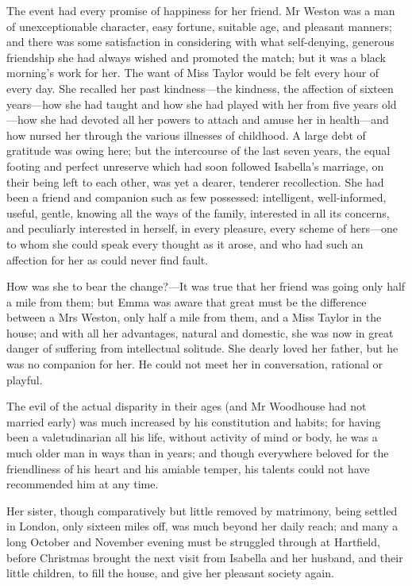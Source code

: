 The event had every promise of happiness for her friend. Mr Weston was a man of unexceptionable character, easy fortune, suitable age, and pleasant manners; and there was some satisfaction in considering with what self-denying, generous friendship she had always wished and promoted the match; but it was a black morning's work for her. The want of Miss Taylor would be felt every hour of every day. She recalled her past kindness—the kindness, the affection of sixteen years—how she had taught and how she had played with her from five years old—how she had devoted all her powers to attach and amuse her in health—and how nursed her through the various illnesses of childhood. A large debt of gratitude was owing here; but the intercourse of the last seven years, the equal footing and perfect unreserve which had soon followed Isabella's marriage, on their being left to each other, was yet a dearer, tenderer recollection. She had been a friend and companion such as few possessed: intelligent, well-informed, useful, gentle, knowing all the ways of the family, interested in all its concerns, and peculiarly interested in herself, in every pleasure, every scheme of hers—one to whom she could speak every thought as it arose, and who had such an affection for her as could never find fault.

How was she to bear the change?—It was true that her friend was going only half a mile from them; but Emma was aware that great must be the difference between a Mrs Weston, only half a mile from them, and a Miss Taylor in the house; and with all her advantages, natural and domestic, she was now in great danger of suffering from intellectual solitude. She dearly loved her father, but he was no companion for her. He could not meet her in conversation, rational or playful.

The evil of the actual disparity in their ages (and Mr Woodhouse had not married early) was much increased by his constitution and habits; for having been a valetudinarian all his life, without activity of mind or body, he was a much older man in ways than in years; and though everywhere beloved for the friendliness of his heart and his amiable temper, his talents could not have recommended him at any time.

Her sister, though comparatively but little removed by matrimony, being settled in London, only sixteen miles off, was much beyond her daily reach; and many a long October and November evening must be struggled through at Hartfield, before Christmas brought the next visit from Isabella and her husband, and their little children, to fill the house, and give her pleasant society again.

